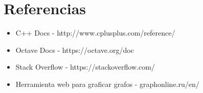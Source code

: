 \section{Referencias}

\begin{itemize}
  \item C++ Docs - http://www.cplusplus.com/reference/
  \item Octave Docs - https://octave.org/doc
  \item Stack Overflow - https://stackoverflow.com/
  \item Herramienta web para graficar grafos - graphonline.ru/en/
\end{itemize}

